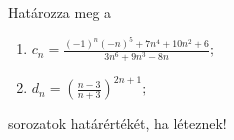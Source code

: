 \documentclass[11pt]{scrartcl}
\begin{document}
Határozza meg a
\begin{enumerate}
	\item \(\displaystyle
	      c_n = \frac{(-1)^n (-n)^5 + 7n^4 + 10n^2 + 6}{3n^6 + 9n^3 - 8n};
	      \)

	\item \(\displaystyle
	      d_n = \left( \frac{n - 3}{n + 3} \right)^{2n + 1};
	      \)
\end{enumerate}
sorozatok határértékét, ha léteznek!
\end{document}
